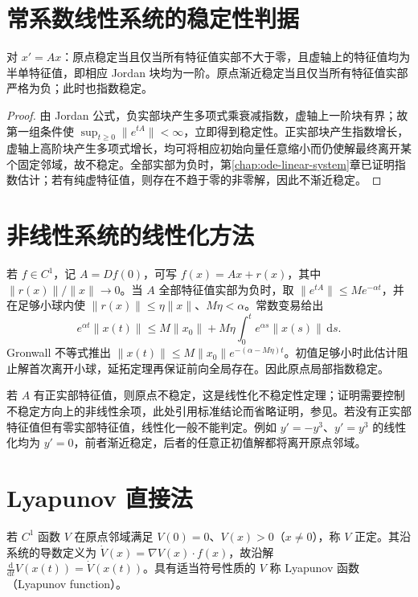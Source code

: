 \documentclass[UTF8,12pt,a4paper,fontset=fandol]{ctexbook}
\begin{document}
\section{常系数线性系统的稳定性判据}
\begin{theorem}
\label{thm:ode-linear-stability}
对 $x'=Ax$：原点稳定当且仅当所有特征值实部不大于零，且虚轴上的特征值均为半单特征值，即相应 Jordan 块均为一阶。原点渐近稳定当且仅当所有特征值实部严格为负；此时也指数稳定。
\end{theorem}
\begin{proof}
由 Jordan 公式，负实部块产生多项式乘衰减指数，虚轴上一阶块有界；故第一组条件使 $\sup_{t\geq0}\|e^{tA}\|<\infty$，立即得到稳定性。正实部块产生指数增长，虚轴上高阶块产生多项式增长，均可将相应初始向量任意缩小而仍使解最终离开某个固定邻域，故不稳定。全部实部为负时，第\ref{chap:ode-linear-system}章已证明指数估计；若有纯虚特征值，则存在不趋于零的非零解，因此不渐近稳定。
\end{proof}

\section{非线性系统的线性化方法}
若 $f\in C^1$，记 $A=Df(0)$，可写 $f(x)=Ax+r(x)$，其中 $\|r(x)\|/\|x\|\to0$。当 $A$ 全部特征值实部为负时，取 $\|e^{tA}\|\leq Me^{-\alpha t}$，并在足够小球内使 $\|r(x)\|\leq\eta\|x\|$、$M\eta<\alpha$。常数变易给出
\[
 e^{\alpha t}\|x(t)\|\leq M\|x_0\|+M\eta\int_0^t e^{\alpha s}\|x(s)\|\,\mathrm ds.
\]
Gronwall 不等式推出 $\|x(t)\|\leq M\|x_0\|e^{-(\alpha-M\eta)t}$。初值足够小时此估计阻止解首次离开小球，延拓定理再保证前向全局存在。因此原点局部指数稳定。

若 $A$ 有正实部特征值，则原点不稳定，这是线性化不稳定性定理；证明需要控制不稳定方向上的非线性余项，此处引用标准结论而省略证明，参见\cite[第9章]{teschl-ode}。若没有正实部特征值但有零实部特征值，线性化一般不能判定。例如 $y'=-y^3$、$y'=y^3$ 的线性化均为 $y'=0$，前者渐近稳定，后者的任意正初值解都将离开原点邻域。

\section{Lyapunov 直接法}
\begin{definition}
若 $C^1$ 函数 $V$ 在原点邻域满足 $V(0)=0$、$V(x)>0$（$x\ne0$），称 $V$ 正定。其沿系统的导数定义为 $\dot V(x)=\nabla V(x)\cdot f(x)$，故沿解 $\frac{\mathrm d}{\mathrm dt}V(x(t))=\dot V(x(t))$。具有适当符号性质的 $V$ 称 Lyapunov 函数（Lyapunov function）。
\end{definition}
\end{document}
